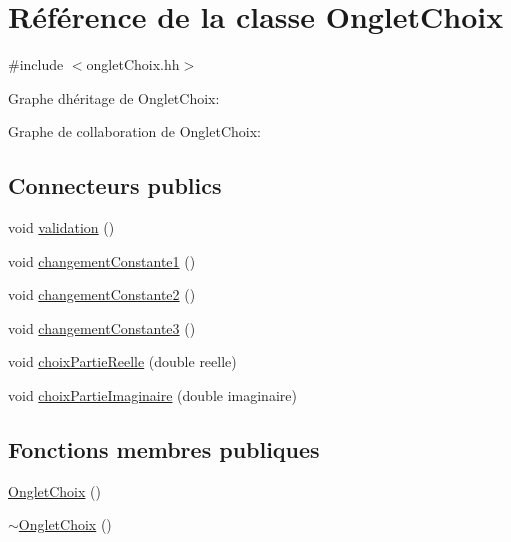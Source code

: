 \hypertarget{classOngletChoix}{}\section{Référence de la classe Onglet\+Choix}
\label{classOngletChoix}


{\ttfamily \#include $<$onglet\+Choix.\+hh$>$}



Graphe d\textquotesingle{}héritage de Onglet\+Choix\+:


Graphe de collaboration de Onglet\+Choix\+:
\subsection*{Connecteurs publics}
\begin{DoxyCompactItemize}
\item 
void \hyperlink{classOngletChoix_ad3cd10f4288ef90f79088e2242d04930}{validation} ()
\item 
void \hyperlink{classOngletChoix_a64dcaf259b31c0f0cbe913f3aaa5c501}{changement\+Constante1} ()
\item 
void \hyperlink{classOngletChoix_a015b22df95995cc3bcec783dc62d5af0}{changement\+Constante2} ()
\item 
void \hyperlink{classOngletChoix_a67fe19298a58a01c36415466597ddb74}{changement\+Constante3} ()
\item 
void \hyperlink{classOngletChoix_ab9c4d2a0468d54825de329606731b676}{choix\+Partie\+Reelle} (double reelle)
\item 
void \hyperlink{classOngletChoix_ac3e007ccd43b21ab632cb4fe270e5ef6}{choix\+Partie\+Imaginaire} (double imaginaire)
\end{DoxyCompactItemize}
\subsection*{Fonctions membres publiques}
\begin{DoxyCompactItemize}
\item 
\hyperlink{classOngletChoix_a9045157d6876f0259e8282c34d00bbe1}{Onglet\+Choix} ()
\item 
\hyperlink{classOngletChoix_ad309587d49a904c8def659b733862085}{$\sim$\+Onglet\+Choix} ()
\end{DoxyCompactItemize}
